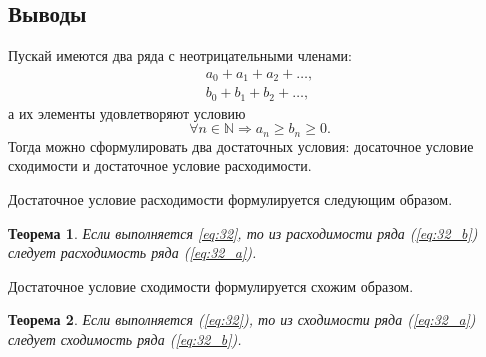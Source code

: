 \documentclass[12pt]{article}
\newtheorem{theorem}{Теорема}[section]
\begin{document}
\subsection{Выводы}
Пускай имеются два ряда с неотрицательными членами:
\begin{eqnarray}
a_0 + a_1 + a_2 + \ldots,
\label{eq:32_a}
\\
b_0 + b_1 + b_2 + \ldots, \label{eq:32_b}
\end{eqnarray}
а их элементы удовлетворяют условию
\begin{equation}\label{eq:32}
    \forall n \in \mathbb{N} \Longrightarrow a_n \ge b_n \ge 0.
\end{equation}
Тогда можно сформулировать два достаточных условия: досаточное условие сходимости и достаточное условие расходимости. 
\par
Достаточное условие расходимости формулируется следующим образом.
\begin{theorem}
Если выполняется \eqref{eq:32},
то из расходимости ряда (\ref{eq:32_b}) следует расходимость ряда (\ref{eq:32_a}).
\end{theorem}
Достаточное условие сходимости формулируется схожим образом.
\begin{theorem}
Если выполняется (\ref{eq:32}), то из сходимости ряда (\ref{eq:32_a}) следует сходимость ряда (\ref{eq:32_b}).
\end{theorem}
\end{document}
